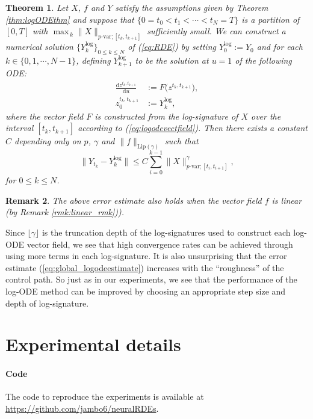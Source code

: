\documentclass{article}
\def\floor#1{\lfloor #1 \rfloor}
\newtheorem{theorem}{Theorem}[section]
\newtheorem{remark}[theorem]{Remark}
\newcommand{\dby}{\mathrm{d}}
\begin{document}
\begin{theorem} Let $X$, $f$ and $Y$ satisfy the assumptions given by Theorem \ref{thm:logODEthm} and suppose that $\{0 = t_0 < t_1 < \cdots < t_N = T\}$ is a partition of $[0,T]$ with $\max_{\,k}\|X\|_{p\text{-var};[t_k,t_{k+1}]}$ sufficiently small. We can construct a numerical solution $\{Y_k^{\log}\}_{0\leq k \leq N}$ of (\ref{eq:RDE}) by setting $Y_0^{\log} := Y_0$ and for each $k \in \{0, 1, \cdots, N - 1\}$, defining $Y_{k+1}^{\log}$ to be the solution at $u=1$ of the following ODE:
\begin{align}
\frac{\dby z^{t_k,t_{k+1}}}{\dby u} & := F\big(z^{t_k,t_{k+1}}\big),\label{eq:standardlogode2}\\
z_0^{t_k,t_{k+1}} & := Y_k^{\log},\nonumber
\end{align}
where the vector field $F$ is constructed from the log-signature of $X$ over the interval $[t_k, t_{k+1}]$ according to (\ref{eq:logodevectfield}). Then there exists a constant $C$ depending only on $p$, $\gamma$ and $\|f\|_{\mathrm{Lip}(\gamma)}$ such that
\begin{equation}
\big\|Y_{t_k} - Y_k^{\log}\big\| \leq C\sum_{i=0}^{k-1}\|X\|_{p\text{-var};[t_i,t_{i+1}]}^\gamma,
\label{eq:global_logodeestimate}
\end{equation}
for $0\leq k\leq N$.
\end{theorem}
\begin{remark}
The above error estimate also holds when the vector field $f$ is linear (by Remark \ref{rmk:linear_rmk})).
\end{remark}

Since $\floor{\gamma}$ is the truncation depth of the log-signatures used to construct each log-ODE vector field, we see that high convergence rates can be achieved through using more terms in each log-signature.
It is also unsurprising that the error estimate (\ref{eq:global_logodeestimate}) increases with the ``roughness'' of the control path.
So just as in our experiments, we see that the performance of the log-ODE method can be improved by choosing an appropriate step size and depth of log-signature.
 
\section{Experimental details} \label{apx:experiments}

\paragraph{Code} The code to reproduce the experiments is available at \url{https://github.com/jambo6/neuralRDEs}. 
\end{document}
